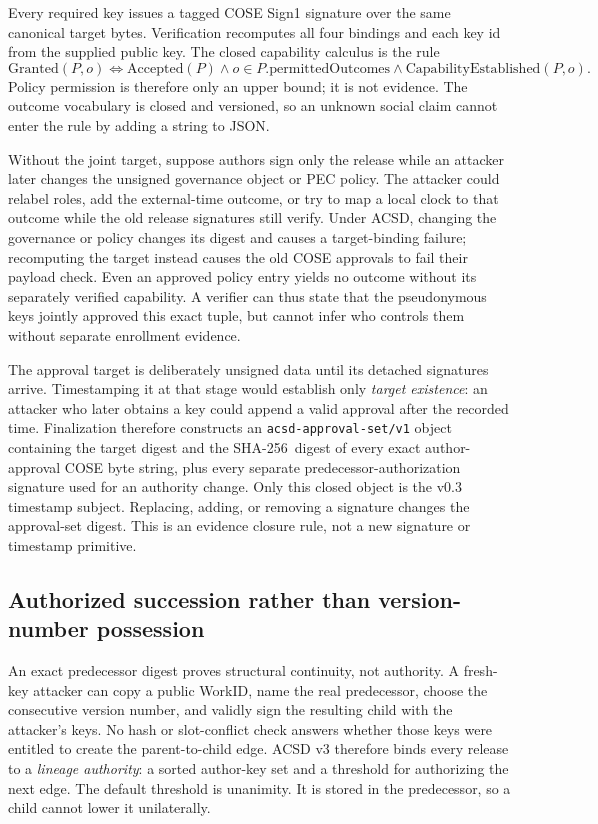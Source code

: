 \documentclass[11pt]{article}
\newcommand{\sha}{\textsf{SHA-256}}
\begin{document}
Every required key issues a tagged COSE Sign1 signature over the same
canonical target bytes. Verification recomputes all four bindings and each key
id from the supplied public key. The closed capability calculus is the rule
\[
 \mathrm{Granted}(P,o) \iff \mathrm{Accepted}(P)
 \land o\in P.\mathrm{permittedOutcomes}
 \land \mathrm{CapabilityEstablished}(P,o).
\]
Policy permission is therefore only an upper bound; it is not evidence. The
outcome vocabulary is closed and versioned, so an unknown social claim
cannot enter the rule by adding a string to JSON.

Without the joint target, suppose authors sign only the release while an
attacker later changes the unsigned governance object or PEC policy. The
attacker could relabel roles, add the external-time outcome, or try to map a
local clock to that outcome while the old release signatures still verify.
Under ACSD, changing the governance or policy changes its digest and causes a
target-binding failure; recomputing the target instead causes the old COSE
approvals to fail their payload check. Even an approved policy entry yields no
outcome without its separately verified capability. A verifier can thus state
that the pseudonymous keys jointly approved this exact tuple, but cannot infer
who controls them without separate enrollment evidence.

The approval target is deliberately unsigned data until its detached
signatures arrive. Timestamping it at that stage would establish only
\emph{target existence}: an attacker who later obtains a key could append a
valid approval after the recorded time. Finalization therefore constructs an
\texttt{acsd-approval-set/v1} object containing the target digest and the
\sha\ digest of every exact author-approval COSE byte string, plus every
separate predecessor-authorization signature used for an authority change.
Only this closed object is the v0.3 timestamp subject. Replacing, adding, or
removing a signature changes the approval-set digest. This is an evidence
closure rule, not a new signature or timestamp primitive.

\subsection{Authorized succession rather than version-number possession}

An exact predecessor digest proves structural continuity, not authority. A
fresh-key attacker can copy a public WorkID, name the real predecessor, choose
the consecutive version number, and validly sign the resulting child with the
attacker's keys. No hash or slot-conflict check answers whether those keys were
entitled to create the parent-to-child edge. ACSD v3 therefore binds every
release to a \emph{lineage authority}: a sorted author-key set and a threshold
for authorizing the next edge. The default threshold is unanimity. It is stored
in the predecessor, so a child cannot lower it unilaterally.
\end{document}
